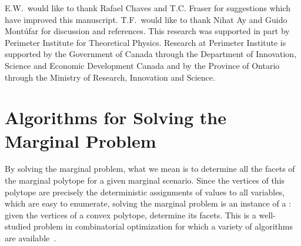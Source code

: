 \documentclass[aps,english,superscriptaddress,onecolumn,twoside,longbibliography,pra,floatfix,fleqn,nofootinbib]{revtex4-1}%
\newcommand*{\tblue}[1]{{\color{MidnightBlue}{\textbf{#1}}}}
\theoremstyle{definition}
\begin{document}






\begin{acknowledgments}
E.W.~would like to thank Rafael Chaves and T.C. Fraser for suggestions which have improved this manuscript. T.F.~would like to thank Nihat Ay and Guido Mont\'ufar for discussion and references. This research was supported in part by Perimeter Institute for Theoretical Physics. Research at Perimeter Institute is supported by the Government of Canada through the Department of Innovation, Science and Economic Development Canada and by the Province of Ontario through the Ministry of Research, Innovation and Science.
\end{acknowledgments}


\appendix
{}
\let\stdsection\section
\renewcommand{\section}{\clearpage\stdsection} %






\section{Algorithms for Solving the Marginal Problem}\label{sec:projalgorithms}

By solving the marginal problem, what we mean is to determine all the facets of the marginal polytope for a given marginal scenario. Since the vertices of this polytope are precisely the deterministic assignments of values to all variables, which are easy to enumerate, solving the marginal problem is an instance of a \tblue{facet enumeration problem}: given the vertices of a convex polytope, determine its facets. This is a well-studied problem in combinatorial optimization for which a variety of algorithms are available~\cite{avis_convexhull_2015}. 
\end{document}
